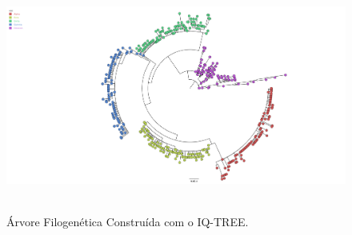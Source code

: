 \begin{figure}[htb]
  \centering
  \caption{Árvore Filogenética Construída com o IQ-TREE.}
  \includegraphics[scale=0.2]{figuras/filogenia_tradicional/sequencias_treinamento.fasta.treefile.pdf}
  ~\label{fig:arvoreIqtree}
\end{figure}


